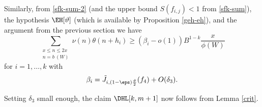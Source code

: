 Similarly, from \eqref{sfk-sum-2} (and the upper bound $S(f_{i,j}) < 1$ from \eqref{sfk-sum}), the hypothesis $\EH[\vartheta]$ (which is available by Proposition \ref{geh-eh}), and the argument from the previous section we have
$$ 
 \sum_{\substack{x \leq n \leq 2x\\ n = b\ (W)}} \nu(n) \theta(n+h_i) \geq (\beta_i - o(1)) B^{1-k} \frac{x}{\phi(W)}$$
for $i=1,\dots,k$ with
$$ \beta_i = \tilde J_{i, (1-\eps) \frac{\vartheta}{2}}( f_4 ) + O(\delta_3).$$

Setting $\delta_3$ small enough, the claim $\DHL[k,m+1]$ now follows from Lemma \ref{crit}.